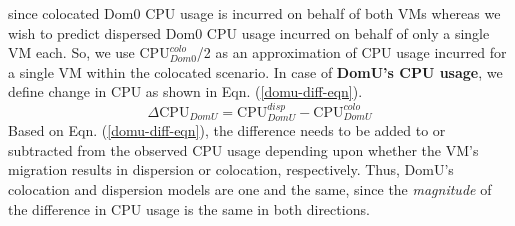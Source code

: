 since colocated Dom0 CPU usage
is incurred on behalf of both VMs whereas we wish to predict
dispersed Dom0 CPU usage incurred on behalf of only a single VM each.
So, we use $\mbox{CPU}^{colo}_{Dom0}$/2 as an approximation of CPU usage
incurred for a single VM within the colocated scenario.
In case of \textbf{DomU's CPU usage}, we define change
in CPU as shown in Eqn. (\ref{domu-diff-eqn}).
\begin{equation}
	\Delta\mbox{CPU}_{DomU} = \mbox{CPU}^{disp}_{DomU} - \mbox{CPU}^{colo}_{DomU}
	\label{domu-diff-eqn}
\end{equation}
Based on Eqn. (\ref{domu-diff-eqn}), the difference needs to
be added to or subtracted from the observed CPU usage depending upon
whether the VM's migration results in dispersion or colocation, respectively. 
Thus, DomU's
colocation and dispersion models are one and the same, since the
\textit{magnitude} of the difference in CPU usage is the same in both
directions.

